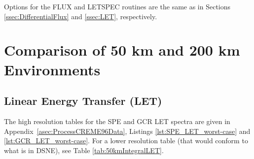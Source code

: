 \documentclass{hitec}
\begin{document}
Options for the \textsf{FLUX} and \textsf{LETSPEC} routines are the same as in Sections \ref{ssec:DifferentialFlux} and \ref{ssec:LET}, respectively.


\section{Comparison of 50 km and 200 km Environments}\label{sec:ComparisonOf50kmAnd200kmEnvironments}

\subsection{Linear Energy Transfer (LET)}

The high resolution tables for the SPE and GCR LET spectra are given in Appendix~\ref{asec:ProcessCREME96Data}, Listings \ref{lst:SPE_LET_worst-case} and \ref{lst:GCR_LET_worst-case}. For a lower resolution table (that would conform to what is in DSNE), see Table \ref{tab:50kmIntegralLET}.
\end{document}
